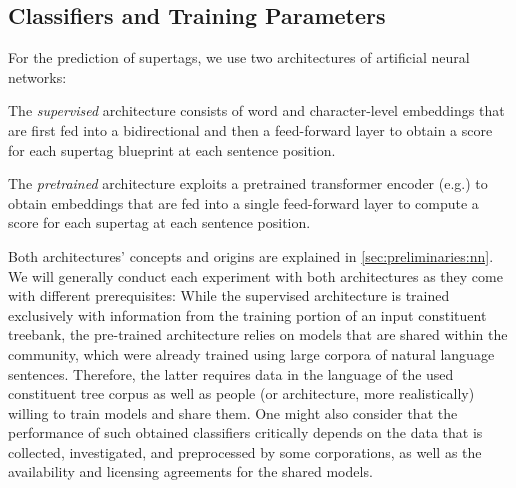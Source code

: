 \documentclass[../../document.tex]{subfiles}
\begin{document}
    \subsection{Classifiers and Training Parameters}
    For the prediction of supertags, we use two architectures of artificial neural networks:
    \begin{compactitem}
        \item The \emph{supervised} architecture consists of word and character-level embeddings that are first fed into a bidirectional  and then a feed-forward layer to obtain a score for each supertag blueprint at each sentence position.
        \item The \emph{pretrained} architecture exploits a pretrained transformer encoder (e.g.\@ {}) to obtain embeddings that are fed into a single feed-forward layer to compute a score for each supertag at each sentence position.
    \end{compactitem}
    Both architectures' concepts and origins are explained in \cref{sec:preliminaries:nn}.
    We will generally conduct each experiment with both architectures as they come with different prerequisites:
        While the supervised architecture is trained exclusively with information from the training portion of an input constituent treebank, the pre-trained architecture relies on models that are shared within the  community, which were already trained using large corpora of natural language sentences.
        Therefore, the latter requires data in the language of the used constituent tree corpus as well as people (or architecture, more realistically) willing to train models and share them.
        One might also consider that the performance of such obtained classifiers critically depends on the data that is collected, investigated, and preprocessed by some corporations, as well as the availability and licensing agreements for the shared models.
\end{document}
